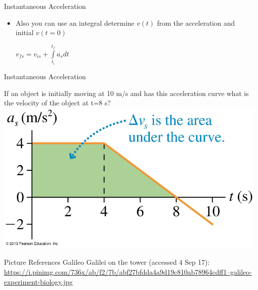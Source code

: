 \documentclass{beamer}
\begin{document}
\begin{frame}{Instantaneous Acceleration}
\begin{itemize}
   \item<3-> Also you can use an integral determine $v(t)$ from the acceleration and initial $v(t=0)$ \\ \begin{center}$v_{fs} = v_{is} + \int\limits_{t_i}^{t_f} a_s dt$\end{center}
\end{itemize}
\end{frame}

\begin{frame}{Instantaneous Acceleration}
\begin{center}
   If an object is initially moving at 10 m/s and has this acceleration curve what is the velocity of the object at t=8 s?
   \includegraphics[width=\textwidth]{../figures/02_41_Figure.jpg}
\end{center}
\end{frame}

\begin{frame}{Picture References}
\tiny
Galileo Galilei on the tower (accessed 4 Sep 17): \href{https://i.pinimg.com/736x/ab/f2/7b/abf27bfdda4a9d19c810ab78964cdff1--galileo-experiment-biology.jpg}{https://i.pinimg.com/736x/ab/f2/7b/abf27bfdda4a9d19c810ab78964cdff1--galileo-experiment-biology.jpg}
\end{frame}
\end{document}
